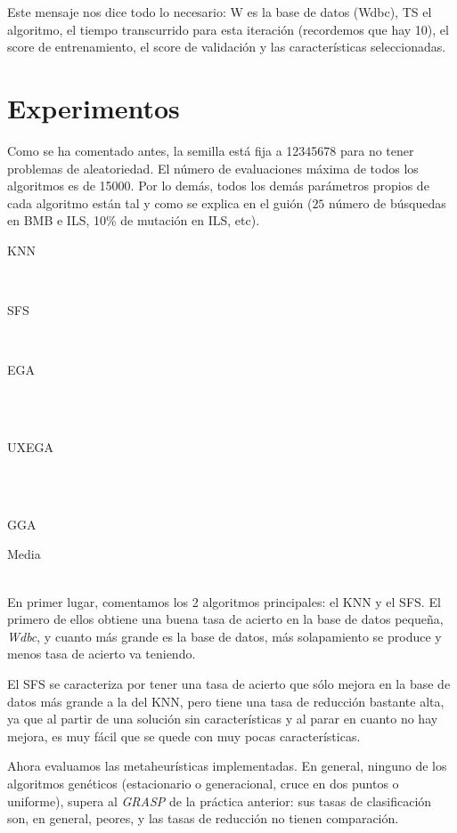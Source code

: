 \documentclass[a4paper, 11pt]{article}
\begin{document}
    Este mensaje nos dice todo lo necesario: W es la base de datos (Wdbc), TS el algoritmo, el tiempo transcurrido para esta iteración (recordemos que hay 10), el score de entrenamiento, el score de validación y las características seleccionadas.
  \section{Experimentos}
    Como se ha comentado antes, la semilla está fija a 12345678 para no tener problemas de aleatoriedad. El número de evaluaciones máxima de todos los algoritmos es de 15000. Por lo demás, todos los demás parámetros propios de cada algoritmo están tal y como se explica en el guión ($25$ número de búsquedas en BMB e ILS, 10\% de mutación en ILS, etc). \\

    \newpage

    \centerline{KNN}
    \\
    \centerline{SFS}
    
    \\ \centerline{EGA}
    \\
    \\ \centerline{UXEGA}
    \\
    \\ \centerline{GGA}
    
    \centerline{Media}
    \\

    En primer lugar, comentamos los 2 algoritmos principales: el KNN y el SFS. El primero de ellos obtiene una buena tasa de acierto en la base de datos pequeña, \emph{Wdbc}, y cuanto más grande es la base de datos, más solapamiento se produce y menos tasa de acierto va teniendo.

    El SFS se caracteriza por tener una tasa de acierto que sólo mejora en la base de datos más grande a la del KNN, pero tiene una tasa de reducción bastante alta, ya que al partir de una solución sin características y al parar en cuanto no hay mejora, es muy fácil que se quede con muy pocas características.

    Ahora evaluamos las metaheurísticas implementadas. En general, ninguno de los algoritmos genéticos (estacionario o generacional, cruce en dos puntos o uniforme), supera al \emph{GRASP} de la práctica anterior: sus tasas de clasificación son, en general, peores, y las tasas de reducción no tienen comparación.
\end{document}
